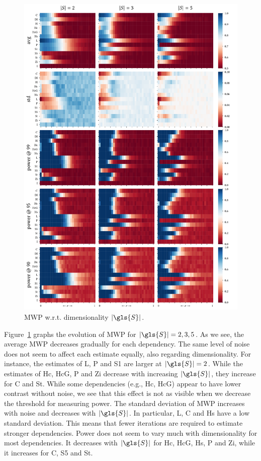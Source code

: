 \begin{figure}
	\centering
	\includegraphics[width=1.0\linewidth]{part2-figures/Fig4-3_thesis-compressed.pdf}
	\caption{\gls{MWP} w.r.t. dimensionality $|\gls{S}|$.}
	\label{fig:momentsMWP}
\end{figure}

Figure~\ref{fig:momentsMWP} graphs the evolution of \gls{MWP} for $|\gls{S}| = 2,3,5$. 
As we see, the average \gls{MWP} decreases gradually for each dependency. The same level of noise does not seem to affect each estimate equally, also regarding dimensionality. 
For instance, the estimates of L, P and S1 are larger at $|\gls{S}|=2$.
While the estimates of Hc, HcG, P and Zi decrease with increasing $|\gls{S}|$, they increase for C and St. While some dependencies (e.g., Hc, HcG) appear to have lower contrast without noise, we see that this effect is not as visible when we decrease the threshold for measuring power. 
The standard deviation of \gls{MWP} increases with noise and decreases with $|\gls{S}|$. In particular, L, C and Hs have a low standard deviation. This means that fewer iterations are required to estimate stronger dependencies. 
Power does not seem to vary much with dimensionality for most dependencies. It decreases with $|\gls{S}|$ for Hc, HcG, Hs, P and Zi, while it increases for C, S5 and St. 

